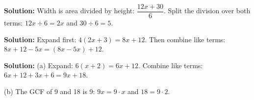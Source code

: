 \documentclass[12pt]{article}
\begin{document}

\textbf{Solution:} Width is area divided by height: $\dfrac{12x + 30}{6}$. Split the
division over both terms: $12x \div 6 = 2x$ and $30 \div 6 = 5$.


\textbf{Solution:} Expand first: $4(2x + 3) = 8x + 12$. Then combine like terms:
$8x + 12 - 5x = (8x - 5x) + 12$. 


\textbf{Solution:} (a) Expand: $6(x + 2) = 6x + 12$. Combine like terms:
$6x + 12 + 3x + 6 = 9x + 18$. 

(b) The GCF of 9 and 18 is 9: $9x = 9 \cdot x$ and $18 = 9 \cdot 2$. 
\end{document}
